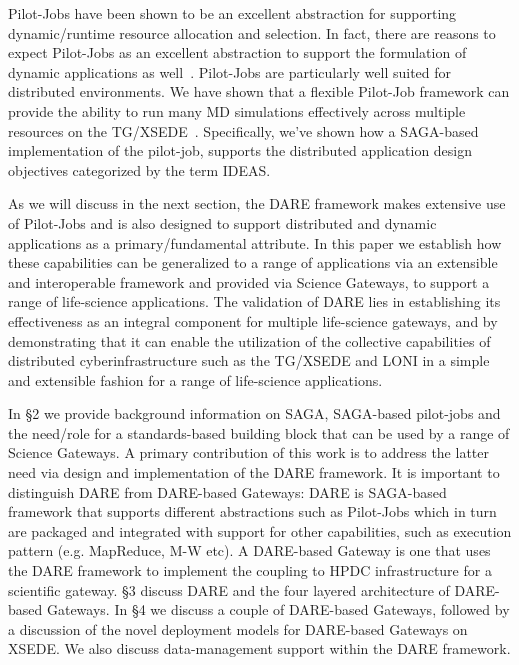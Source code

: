 \documentclass[]{svjour3}
\begin{document}
Pilot-Jobs have been shown to be an excellent abstraction for
supporting dynamic/runtime resource allocation and selection.  In
fact, there are reasons to expect Pilot-Jobs as an excellent
abstraction to support the formulation of dynamic applications as
well~\cite{pstar11}.  Pilot-Jobs are particularly well suited for
distributed environments.  We have shown that a flexible Pilot-Job
framework can provide the ability to run many MD simulations
effectively across multiple resources on the
TG/XSEDE~\cite{saga-royalsoc, saga-ccgrid10}.  Specifically, we've
shown how a SAGA-based implementation of the pilot-job, supports the
distributed application design objectives categorized by the term
IDEAS\cite{ideas}.

As we will discuss in the next section, the DARE framework makes
extensive use of Pilot-Jobs and is also designed to support
distributed and dynamic applications as a primary/fundamental
attribute.  In this paper we establish how these capabilities can be
generalized to a range of applications via an extensible and
interoperable framework and provided via Science Gateways, to support
a range of life-science applications.  The validation of DARE lies in
establishing its effectiveness as an integral component for multiple
life-science gateways, and by demonstrating that it can enable the
utilization of the collective capabilities of distributed
cyberinfrastructure such as the TG/XSEDE and LONI in a simple and
extensible fashion for a range of life-science applications.

In \S2 we provide background information on SAGA, SAGA-based
pilot-jobs and the need/role for a standards-based building block that
can be used by a range of Science Gateways.  A primary contribution of
this work is to address the latter need via design and implementation
of the DARE framework.  It is important to distinguish DARE from
DARE-based Gateways: DARE is SAGA-based framework that supports
different abstractions such as Pilot-Jobs which in turn are packaged
and integrated with support for other capabilities, such as execution
pattern (e.g. MapReduce, M-W etc). A DARE-based Gateway is one that
uses the DARE framework to implement the coupling to HPDC
infrastructure for a scientific gateway.  \S3 discuss DARE and the
four layered architecture of DARE-based Gateways. In \S4 we discuss a
couple of DARE-based Gateways, followed by a discussion of the novel
deployment models for DARE-based Gateways on XSEDE. We also discuss
data-management support within the DARE framework.
\end{document}
